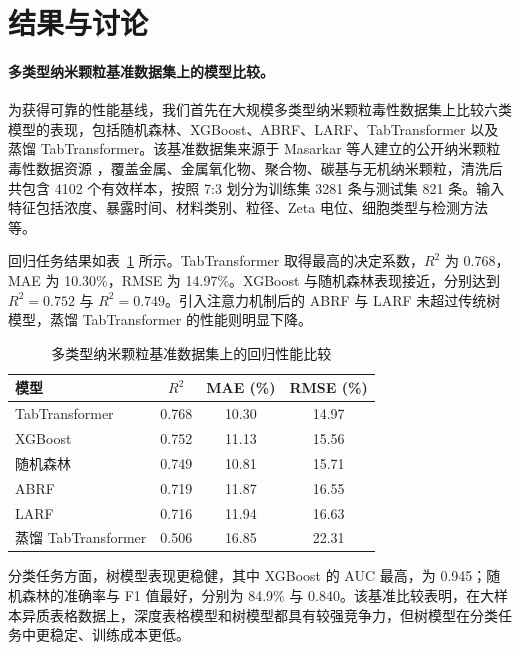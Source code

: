 \section{结果与讨论}

\paragraph{多类型纳米颗粒基准数据集上的模型比较。}
为获得可靠的性能基线，我们首先在大规模多类型纳米颗粒毒性数据集上比较六类模型的表现，包括随机森林\cite{breiman2001random}、XGBoost\cite{chen2016xgboost}、ABRF\cite{gromov2022attention}、LARF\cite{gromov2022larf}、TabTransformer\cite{huang2020tabtransformer} 以及蒸馏 TabTransformer\cite{hinton2015distilling}。该基准数据集来源于 Masarkar 等人建立的公开纳米颗粒毒性数据资源 \cite{masarkar2024}，覆盖金属、金属氧化物、聚合物、碳基与无机纳米颗粒，清洗后共包含 4102 个有效样本，按照 7:3 划分为训练集 3281 条与测试集 821 条。输入特征包括浓度、暴露时间、材料类别、粒径、Zeta 电位、细胞类型与检测方法等。

回归任务结果如表~\ref{tab:benchmark_regression} 所示。TabTransformer 取得最高的决定系数，$R^2$ 为 0.768，MAE 为 10.30\%，RMSE 为 14.97\%。XGBoost 与随机森林表现接近，分别达到 $R^2=0.752$ 与 $R^2=0.749$。引入注意力机制后的 ABRF 与 LARF 未超过传统树模型，蒸馏 TabTransformer 的性能则明显下降。

\begin{table}[htbp]
  \centering
  \caption{多类型纳米颗粒基准数据集上的回归性能比较}
  \label{tab:benchmark_regression}
  \begin{tabular}{lccc}
    \hline
    模型 & $R^2$ & MAE (\%) & RMSE (\%) \\
    \hline
    TabTransformer & 0.768 & 10.30 & 14.97 \\
    XGBoost & 0.752 & 11.13 & 15.56 \\
    随机森林 & 0.749 & 10.81 & 15.71 \\
    ABRF & 0.719 & 11.87 & 16.55 \\
    LARF & 0.716 & 11.94 & 16.63 \\
    蒸馏 TabTransformer & 0.506 & 16.85 & 22.31 \\
    \hline
  \end{tabular}
\end{table}

分类任务方面，树模型表现更稳健，其中 XGBoost 的 AUC 最高，为 0.945；随机森林的准确率与 F1 值最好，分别为 84.9\% 与 0.840。该基准比较表明，在大样本异质表格数据上，深度表格模型和树模型都具有较强竞争力，但树模型在分类任务中更稳定、训练成本更低。

